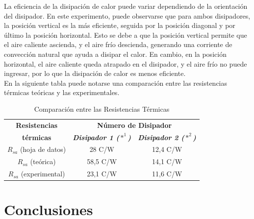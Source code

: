 \documentclass[conference]{IEEEtran}
\begin{document}
    La eficiencia de la disipación de calor puede variar dependiendo de la orientación del disipador. 
    En este experimento, puede observarse que para ambos disipadores, la posición vertical es la más eficiente,
    seguida por la posición diagonal y por último la posición horizontal. Esto se debe a que la posición vertical
    permite que el aire caliente ascienda, y el aire frío descienda, generando una corriente de convección natural
    que ayuda a disipar el calor. En cambio, en la posición horizontal, el aire caliente queda atrapado en el disipador,
    y el aire frío no puede ingresar, por lo que la disipación de calor es menos eficiente.\\

    En la siguiente tabla puede notarse una comparación entre las resistencias térmicas teóricas y las experimentales.
    \begin{table}[htbp]
        \caption{Comparación entre las Resistencias Térmicas}
        \begin{center}
        \begin{tabular}{|c|c|c|}
        \hline
        \textbf{Resistencias} & \multicolumn{2}{c|}{\textbf{Número de Disipador}} \\
        \cline{2-3}
        \textbf{térmicas} & \textbf{\textit{Disipador 1 ($*^1$)}} & \textbf{\textit{Disipador 2 ($*^2$)}} \\
        \hline
        $R_{sa}$ (hoja de datos) & 28 C/W & 12,4 C/W \\
        \hline
        $R_{sa}$ (teórica) & 58,5 C/W & 14,1 C/W \\
        \hline
        $R_{sa}$ (experimental) & 23,1 C/W & 11,6 C/W \\
        \hline
        \end{tabular}
        \label{tab1}
        \end{center}
    \end{table}

    \section{Conclusiones}
\end{document}
